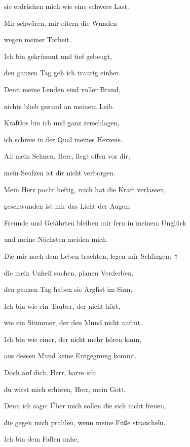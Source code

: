 sie erdrücken mich wie eine schwere Last.
 
\noindent Mir schwären, mir eitern die Wunden~\GreStar{}~\nopagebreak

wegen meiner Torheit.
 
\noindent Ich bin gekrümmt und tief gebeugt,~\GreStar{}~\nopagebreak

den ganzen Tag geh ich traurig einher.
 
\noindent Denn meine Lenden sind voller Brand,~\GreStar{}~\nopagebreak

nichts blieb gesund an meinem Leib.
 
\noindent Kraftlos bin ich und ganz zerschlagen,~\GreStar{}~\nopagebreak

ich schreie in der Qual meines Herzens.
 
\noindent All mein Sehnen, Herr, liegt offen vor dir,~\GreStar{}~\nopagebreak

mein Seufzen ist dir nicht verborgen.
 
\noindent Mein Herz pocht heftig, mich hat die Kraft verlassen,~\GreStar{}~\nopagebreak

geschwunden ist mir das Licht der Augen.
 
\noindent Freunde und Gefährten bleiben mir fern in meinem Unglück~\GreStar{}~\nopagebreak

und meine Nächsten meiden mich.
 
\noindent Die mir nach dem Leben trachten, legen mir Schlingen;~†~\nopagebreak

die mein Unheil suchen, planen Verderben,~\GreStar{}~\nopagebreak

den ganzen Tag haben sie Arglist im Sinn.
 
\noindent Ich bin wie ein Tauber, der nicht hört,~\GreStar{}~\nopagebreak

wie ein Stummer, der den Mund nicht auftut.
 
\noindent Ich bin wie einer, der nicht mehr hören kann,~\GreStar{}~\nopagebreak

aus dessen Mund keine Entgegnung kommt.
 
\noindent Doch auf dich, Herr, harre ich;~\GreStar{}~\nopagebreak

du wirst mich erhören, Herr, mein Gott.
 
\noindent Denn ich sage: Über mich sollen die sich nicht freuen,~\GreStar{}~\nopagebreak

die gegen mich prahlen, wenn meine Füße straucheln.
 
\noindent Ich bin dem Fallen nahe,~\GreStar{}~\nopagebreak

